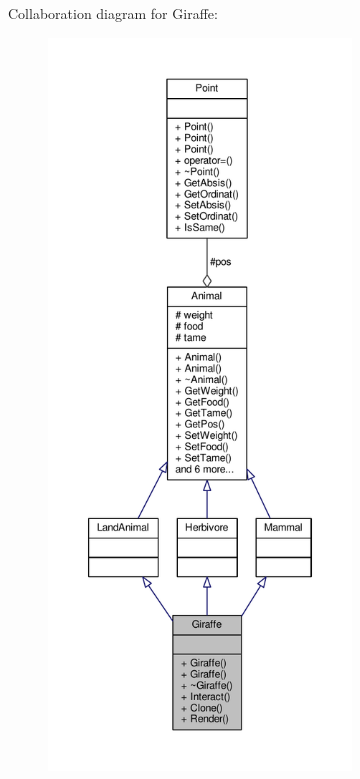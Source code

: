 Collaboration diagram for Giraffe\+:
\nopagebreak
\begin{figure}[H]
\begin{center}
\leavevmode
\includegraphics[height=550pt]{classGiraffe__coll__graph}
\end{center}
\end{figure}
